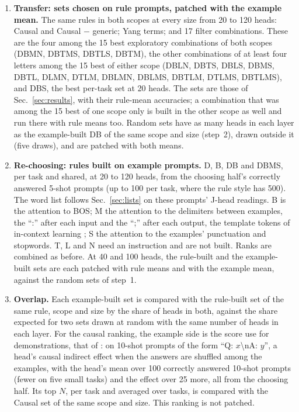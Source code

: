 \documentclass[10pt,a4paper]{article}
\begin{document}
\begin{enumerate}
\item \textbf{Transfer: sets chosen on rule prompts, patched with the example mean.} The same rules in both scopes at every size from 20 to 120 heads: Causal and Causal $-$ generic; Yang terms; and 17 filter combinations. These are the four among the 15 best exploratory combinations of both scopes (DBMN, DBTMS, DBTLS, DBTM), the other combinations of at least four letters among the 15 best of either scope (DBLN, DBTS, DBLS, DBMS, DBTL, DLMN, DTLM, DBLMN, DBLMS, DBTLM, DTLMS, DBTLMS), and DBS, the best per-task set at 20 heads. The sets are those of Sec.~\ref{sec:results}, with their rule-mean accuracies; a combination that was among the 15 best of one scope only is built in the other scope as well and run there with rule means too. Random sets have as many heads in each layer as the example-built DB of the same scope and size (step~2), drawn outside it (five draws), and are patched with both means.
\item \textbf{Re-choosing: rules built on example prompts.} D, B, DB and DBMS, per task and shared, at 20 to 120 heads, from the choosing half's correctly answered 5-shot prompts (up to 100 per task, where the rule style has 500). The word list follows Sec.~\ref{sec:lists} on these prompts' J-head readings. B is the attention to BOS; M the attention to the delimiters between examples, the ``:'' after each input and the ``;'' after each output, the template tokens of in-context learning \citep{bai2026performance}; S the attention to the examples' punctuation and stopwords. T, L and N need an instruction and are not built. Ranks are combined as before. At 40 and 100 heads, the rule-built and the example-built sets are each patched with rule means and with the example mean, against the random sets of step~1.
\item \textbf{Overlap.} Each example-built set is compared with the rule-built set of the same rule, scope and size by the share of heads in both, against the share expected for two sets drawn at random with the same number of heads in each layer. For the causal ranking, the example side is the score \citet{davidson2025different} use for demonstrations, that of \citet{todd2024function}: on 10-shot prompts of the form ``Q: $x$\textbackslash nA: $y$'', a head's causal indirect effect when the answers are shuffled among the examples, with the head's mean over 100 correctly answered 10-shot prompts (fewer on five small tasks) and the effect over 25 more, all from the choosing half. Its top $N$, per task and averaged over tasks, is compared with the Causal set of the same scope and size. This ranking is not patched.
\end{enumerate}
\end{document}
